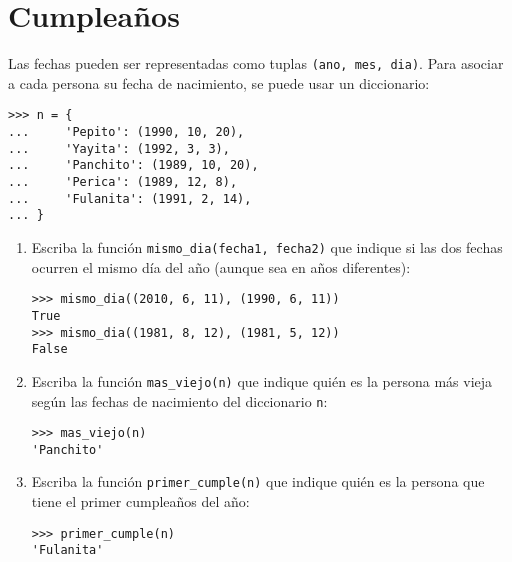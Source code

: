 \section{Cumpleaños}

Las fechas pueden ser representadas como tuplas
\texttt{(ano, mes, dia)}.
Para asociar a cada persona su fecha de nacimiento, se puede usar un
diccionario:
\begin{lstlisting}
>>> n = {
...     'Pepito': (1990, 10, 20),
...     'Yayita': (1992, 3, 3),
...     'Panchito': (1989, 10, 20),
...     'Perica': (1989, 12, 8),
...     'Fulanita': (1991, 2, 14),
... }
\end{lstlisting}

\begin{enumerate}

\item
Escriba la función
\lstinline!mismo_dia(fecha1, fecha2)! que indique si las dos fechas
ocurren el mismo día del año (aunque sea en años diferentes):

\begin{lstlisting}
>>> mismo_dia((2010, 6, 11), (1990, 6, 11))
True
>>> mismo_dia((1981, 8, 12), (1981, 5, 12))
False
\end{lstlisting}

\item
Escriba la función \lstinline!mas_viejo(n)! que
indique quién es la persona más vieja según las fechas de nacimiento del
diccionario \lstinline!n!:

\begin{lstlisting}
>>> mas_viejo(n)
'Panchito'
\end{lstlisting}

\item
Escriba la función \lstinline!primer_cumple(n)!
que indique quién es la persona que tiene el primer cumpleaños del año:

\begin{lstlisting}
>>> primer_cumple(n)
'Fulanita'
\end{lstlisting}

\end{enumerate}
